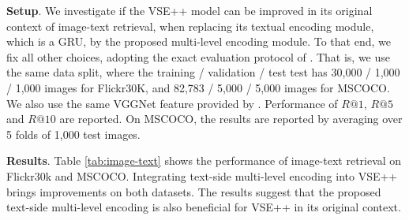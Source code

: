 \textbf{Setup}.
We investigate if the VSE++ model \cite{faghri2017vse} can be improved in its original context of image-text retrieval, when replacing its textual encoding module, which is a GRU, by the proposed multi-level encoding module. To that end, we fix all other choices, adopting the exact evaluation protocol of \cite{faghri2017vse}. That is, we use the same data split, where the training / validation / test test has 30,000 / 1,000 / 1,000 images for Flickr30K, and 82,783 / 5,000 / 5,000 images for MSCOCO. We also use the same VGGNet feature provided by \cite{faghri2017vse}. Performance of $R@1$, $R@5$ and $R@10$ are reported. On MSCOCO, the results are reported by averaging over 5 folds of 1,000 test images.


\textbf{Results}.
Table \ref{tab:image-text} shows the performance of image-text retrieval on Flickr30k and MSCOCO. Integrating text-side multi-level encoding into VSE++ brings improvements on both datasets.  The results suggest that the proposed text-side multi-level encoding is also beneficial for VSE++ in its original context.

